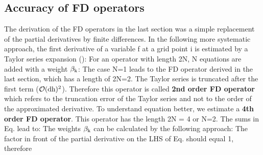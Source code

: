 \subsection{Accuracy of FD operators}
The derivation of the FD operators in the last section was a simple replacement of the partial derivatives by finite differences. In the following more systematic approach, the first derivative of a variable f at a grid point i is estimated by a Taylor series expansion (\cite{jastram:92a}):
For an operator with length 2N, N equations are added with a weight $\rm{\beta_k}$:
The case N=1 leads to the FD operator derived in the last section, which has a length of 2N=2. The Taylor series is truncated after the first term ($\rm{{\mathcal{O}}(dh)^{2}}$). 
Therefore this operator is called {\bf{2nd order FD operator}} which refers to the truncation error of the Taylor series and not to the order of the approximated derivative.
To understand equation  better, we estimate a {\bf{4th order FD operator}}. This operator has the length 2N = 4 or N=2. The sums in Eq.  lead to:
The weights $\rm{\beta_k}$ can be calculated by the following approach: 
The factor in front of the partial derivative on the LHS of Eq.  should equal 1, therefore
